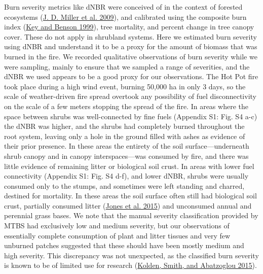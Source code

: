\documentclass[
  12pt,
]{article}
\begin{document}
Burn severity metrics like dNBR were conceived of in the context of
forested ecosystems (\protect\hyperlink{ref-Miller2009}{J. D. Miller et
al. 2009}), and calibrated using the composite burn index
(\protect\hyperlink{ref-Key1999}{Key and Benson 1999}), tree mortality,
and percent change in tree canopy cover. These do not apply in shrubland
systems. Here we estimated burn severity using dNBR and understand it to
be a proxy for the amount of biomass that was burned in the fire. We
recorded qualitative observations of burn severity while we were
sampling, mainly to ensure that we sampled a range of severities, and
the dNBR we used appears to be a good proxy for our observations. The
Hot Pot fire took place during a high wind event, burning 50,000 ha in
only 3 days, so the scale of weather-driven fire spread overtook any
possibility of fuel disconnectivity on the scale of a few meters
stopping the spread of the fire. In areas where the space between shrubs
was well-connected by fine fuels (Appendix S1: Fig. S4 a-c) the dNBR was
higher, and the shrubs had completely burned throughout the root system,
leaving only a hole in the ground filled with ashes as evidence of their
prior presence. In these areas the entirety of the soil
surface---underneath shrub canopy and in canopy interspaces---was
consumed by fire, and there was little evidence of remaining litter or
biological soil crust. In areas with lower fuel connectivity (Appendix
S1: Fig. S4 d-f), and lower dNBR, shrubs were usually consumed only to
the stumps, and sometimes were left standing and charred, destined for
mortality. In these areas the soil surface often still had biological
soil crust, partially consumed litter
(\protect\hyperlink{ref-Jones2015}{Jones et al. 2015}) and unconsumed
annual and perennial grass bases. We note that the manual severity
classification provided by MTBS had exclusively low and medium severity,
but our observations of essentially complete consumption of plant and
litter tissues and very few unburned patches suggested that these should
have been mostly medium and high severity. This discrepancy was not
unexpected, as the classified burn severity is known to be of limited
use for research (\protect\hyperlink{ref-Kolden2015}{Kolden, Smith, and
Abatzoglou 2015}).
\end{document}

